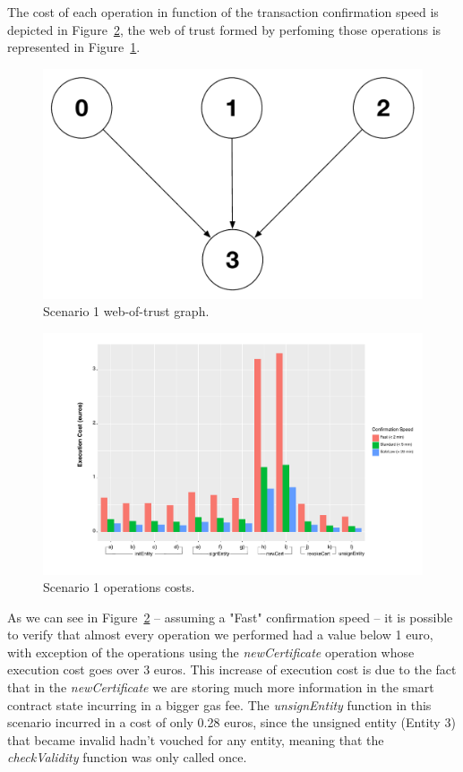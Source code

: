 The cost of each operation in function of the transaction confirmation speed is depicted in Figure~\ref{fig:scenario1-operation-cost}, the web of trust formed by perfoming those operations is represented in Figure~\ref{fig:scenario1-wot-graph}.

\begin{figure}[htb]
  \centering
  \includegraphics[scale=0.5]{Figures/evaluation/wot-scenario1-graph.pdf}
  \caption{Scenario 1 web-of-trust graph.}
\label{fig:scenario1-wot-graph}
\end{figure}

\begin{figure}[htb]
  \centering
  \includegraphics[scale=0.5]{Figures/evaluation/wot-scenario1.pdf}
  \caption{Scenario 1 operations costs.}
\label{fig:scenario1-operation-cost}
\end{figure}

As we can see in Figure~\ref{fig:scenario1-operation-cost} – assuming a "Fast" confirmation speed – it is possible to verify that almost every operation we performed had a value below 1 euro, with exception of the operations using the \textit{newCertificate} operation whose execution cost goes over 3 euros.
This increase of execution cost is due to the fact that in the \textit{newCertificate} we are storing much more information in the smart contract state incurring in a bigger gas fee.
The \textit{unsignEntity} function in this scenario incurred in a cost of only 0.28 euros, since the unsigned entity (Entity 3) that became invalid hadn't vouched for any entity, meaning that the \textit{checkValidity} function was only called once.

